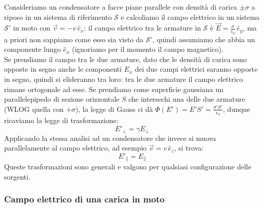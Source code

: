 Consideriamo un condensatore a facce piane parallele con densità di carica $ \pm\sigma $ a riposo in un sistema di riferimento $ \mathcal{S} $ e calcoliamo il campo elettrico in un sistema $ \mathcal{S}' $ in moto con $ \vec{v} = -v\,\hat{e}_x $: il campo elettrico tra le armature in $ \mathcal{S} $ è $ \vec{E} = \frac{\sigma}{\epsilon_0}\,\hat{e}_y $, ma a priori non sappiamo come esso sia visto da $ \mathcal{S}' $, quindi assumiamo che abbia un componente lungo $ \hat{e}_x $ (ignoriamo per il momento il campo magnetico). \\ 
%
Se prendiamo il campo tra le due armature, dato che le densità di carica sono opposte in segno anche le componenti $ E_x $ dei due campi elettrici saranno opposte in segno, quindi si elideranno tra loro: tra le due armature il campo elettrico rimane ortogonale ad esse.
Se prendiamo come superficie gaussiana un parallelepipedo di sezione orizzontale $ S $ che intersechi una delle due armature (WLOG quella con $ +\sigma $), la legge di Gauss ci dà $ \Phi(E') = E'S' = \frac{\sigma'S'}{\epsilon_0} $, dunque ricaviamo la legge di trasformazione:
\begin{equation}
	E'_{\perp} = \gamma E_{\perp}
	\label{eq:28}
\end{equation}
Applicando la stessa analisi ad un condensatore che invece si muova parallelamente al campo elettrico, ad esempio $ \vec{v} = v \,\hat{e}_z $, si trova:
\begin{equation}
	E'_{\parallel} = E_{\parallel}
	\label{eq:29}
\end{equation}
Queste trasformazioni sono generali e valgono per qualsiasi configurazione delle sorgenti.

\subsubsection{Campo elettrico di una carica in moto}

